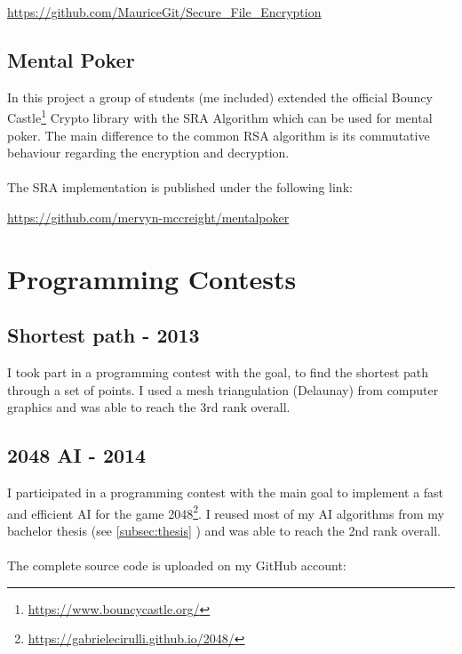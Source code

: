 \documentclass[a4paper, 12pt]{article}
\begin{document}
\begin{center}
	\url{https://github.com/MauriceGit/Secure_File_Encryption}
\end{center}

\newpage

\subsection{Mental Poker}

In this project a group of students (me included) extended the official Bouncy Castle\footnote{\url{https://www.bouncycastle.org/}} Crypto library with the SRA Algorithm which can be used
for mental poker. The main difference to the common RSA algorithm is its commutative behaviour regarding 
the encryption and decryption.
\\
\\
The SRA implementation is published under the following link:

\begin{center}
	\url{https://github.com/mervyn-mccreight/mentalpoker}
\end{center}

\section{Programming Contests}

\subsection{Shortest path - 2013}

I took part in a programming contest with the goal, to find the shortest path through a set of points.
I used a mesh triangulation (Delaunay) from computer graphics and was able to reach the 3rd rank
overall.

\subsection{2048 AI - 2014}

I participated in a programming contest with the main goal to implement a fast and efficient AI for the game
2048\footnote{\url{https://gabrielecirulli.github.io/2048/}}. I reused most of my AI algorithms from my bachelor 
thesis (see \ref{subsec:thesis} \glqq{}\grqq) and was able to reach the 2nd rank overall.
\\
\\
The complete source code is uploaded on my GitHub account:
\end{document}
